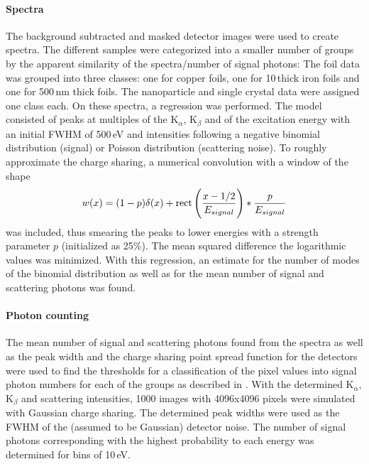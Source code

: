 \paragraph{Spectra}
The background subtracted and masked detector images were used to create spectra. The different samples were categorized into a smaller number of groups by the apparent similarity of the spectra/number of signal photons: The foil  data was grouped into three classes: one for copper foils, one for 10\,\micrometer thick iron foils and one for 500\,nm thick foils. The nanoparticle and single crystal data were assigned one class each.
On these spectra, a regression was performed.  The model consisted of peaks at multiples of the K$_\alpha$, K$_\beta$ and of the excitation energy with an initial FWHM of 500\,eV and intensities following a negative binomial distribution (signal) or Poisson distribution (scattering noise). To roughly approximate the charge sharing, a numerical convolution with a  window of the shape
\begin{equation}
	w (x)= (1-p)\delta(x)+\operatorname{rect}\left(\frac{x-1/2}{E_{signal}}\right)*\frac{p}{E_{signal}}
\end{equation}
was included, thus smearing the peaks to lower energies with a strength parameter $p$ (initialized as 25\%). The mean squared difference the logarithmic values was minimized. With this regression, an estimate for the number of modes of the binomial distribution as well as for the mean number of signal and scattering photons was found.


\paragraph{Photon counting}
The mean number of signal and scattering photons found from the spectra as well as the peak width and the charge sharing point spread function for the detectors were used to find the thresholds for a classification of the pixel values into signal photon numbers for each of the groups as described in . 
With the determined K$_\alpha$, K$_\beta$ and scattering intensities, 1000 images with 4096x4096 pixels were simulated with Gaussian charge sharing. The determined peak widths were used as the FWHM of the (assumed to be Gaussian) detector noise.  The number of signal photons corresponding with the highest probability to each energy was determined for bins of 10\,eV. 


